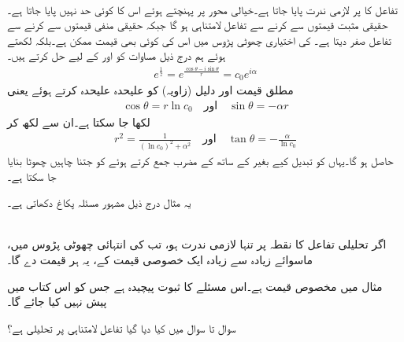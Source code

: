 \quad {}\\
تفاعل  کا  پر لازمی ندرت پایا جاتا ہے۔خیالی محور پر پہنچتے ہوئے اس کا کوئی حد نہیں پایا جاتا ہے۔حقیقی مثبت قیمتوں سے  کرنے سے تفاعل لامتناہی ہو گا جبکہ حقیقی منفی قیمتوں سے   کرنے سے تفاعل صفر دیتا ہے۔ کی اختیاری چھوٹی پڑوس میں اس کی کوئی بھی قیمت  ممکن ہے۔بلکہ  لکھتے ہوئے ہم درج ذیل مساوات کو  اور  کے لیے  حل کرتے ہیں۔
\begin{align*}
e^{\frac{1}{z}}=e^{\frac{\cos \theta-i\sin\theta}{r}}=c_0e^{i\alpha}
\end{align*}
مطلق قیمت اور دلیل (زاویہ) کو علیحدہ علیحدہ کرتے ہوئے     یعنی
\begin{align*}
\cos \theta=r\ln c_0 \quad \text{اور}\quad \sin \theta=-\alpha r 
\end{align*}
لکھا جا سکتا ہے۔ان سے  لکھ کر 
\begin{align*}
r^2=\frac{1}{(\ln c_0)^2+\alpha^2}\quad \text{اور}\quad \tan \theta=-\frac{\alpha}{\ln c_0}
\end{align*}
حاصل ہو گا۔یہاں   کو تبدیل کیے بغیر  کے ساتھ  کے مضرب جمع کرتے ہوئے  کو جتنا چاہیں چھوٹا بنایا جا سکتا ہے۔

یہ مثال درج ذیل مشہور مسئلہ پکاغ  دکھاتی ہے۔

\quad {}  \\
اگر تحلیلی تفاعل  کا نقطہ  پر تنہا لازمی ندرت ہو، تب  کی انتہائی چھوٹی پڑوس میں، ماسوائے زیادہ سے زیادہ ایک خصوصی قیمت کے، یہ ہر قیمت دے گا۔

مثال  میں مخصوص قیمت  ہے۔اس مسئلے کا ثبوت پیچیدہ ہے جس کو اس کتاب میں پیش نہیں کیا جائے گا۔ 

سوال  تا سوال  میں کیا دیا گیا تفاعل لامتناہی پر تحلیلی ہے؟

